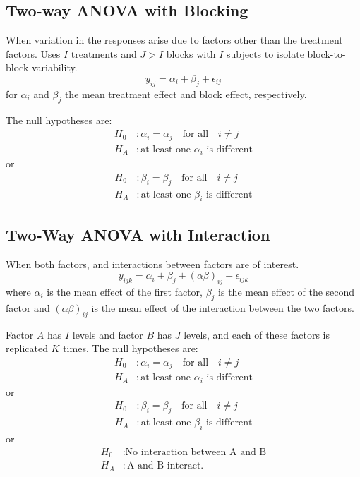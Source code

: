 \documentclass{article}
\begin{document}
\begin{multicols}{3}
    \subsection{Two-way ANOVA with Blocking}
    When variation in the responses arise due to factors other than the treatment factors.
    Uses \(I\) treatments and \(J > I\) blocks with \(I\) subjects to isolate block-to-block variability.
    \begin{equation*}
        y_{ij} = \alpha_i + \beta_j + \epsilon_{ij}
    \end{equation*}
    for \(\alpha_i\) and \(\beta_j\) the mean treatment effect and block effect, respectively.

    The null hypotheses are:
    \begin{align*}
        H_0 & : \alpha_i = \alpha_j \quad \text{for all} \quad i \neq j \\
        H_A & : \text{at least one \(\alpha_i\) is different}
    \end{align*}
    or
    \begin{align*}
        H_0 & : \beta_i = \beta_j \quad \text{for all} \quad i \neq j \\
        H_A & : \text{at least one \(\beta_i\) is different}
    \end{align*}
    \columnbreak
    \subsection{Two-Way ANOVA with Interaction}
    When both factors, and interactions between factors are of interest.
    \begin{equation*}
        y_{ijk} = \alpha_i + \beta_j + \left( \alpha \beta \right)_{ij} + \epsilon_{ijk}
    \end{equation*}
    where \(\alpha_i\) is the mean effect of the first factor, \(\beta_j\) is the mean effect of the second
    factor and \(\left( \alpha \beta \right)_{ij}\) is the mean effect of the interaction between the two factors.

    Factor \(A\) has \(I\) levels and factor \(B\) has \(J\) levels, and
    each of these factors is replicated \(K\) times.
    The null hypotheses are:
    \begin{align*}
        H_0 & : \alpha_i = \alpha_j \quad \text{for all} \quad i \neq j \\
        H_A & : \text{at least one \(\alpha_i\) is different}
    \end{align*}
    or
    \begin{align*}
        H_0 & : \beta_i = \beta_j \quad \text{for all} \quad i \neq j \\
        H_A & : \text{at least one \(\beta_i\) is different}
    \end{align*}
    or
    \begin{align*}
        H_0 & : \text{No interaction between A and B} \\
        H_A & : \text{A and B interact}.
    \end{align*}
\end{multicols}
\end{document}
